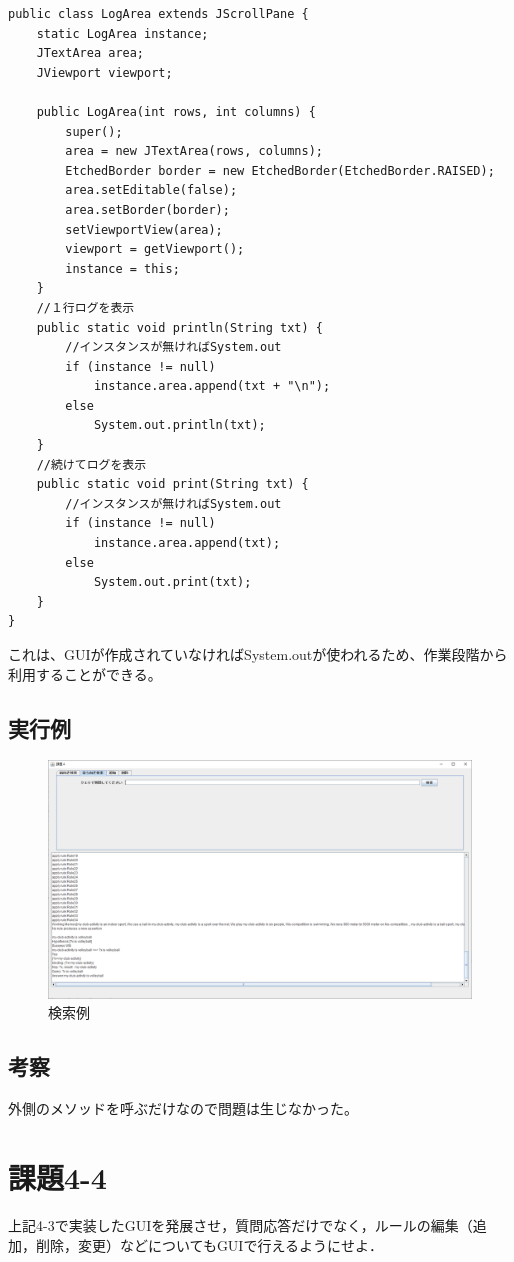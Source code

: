 \documentclass{jarticle}
\begin{document}
\begin{lstlisting}[caption=Log,label=src:log]
public class LogArea extends JScrollPane {
	static LogArea instance;
	JTextArea area;
	JViewport viewport;

	public LogArea(int rows, int columns) {
		super();
		area = new JTextArea(rows, columns);
		EtchedBorder border = new EtchedBorder(EtchedBorder.RAISED);
		area.setEditable(false);
		area.setBorder(border);
		setViewportView(area);
		viewport = getViewport();
		instance = this;
	}
	//１行ログを表示
	public static void println(String txt) {
    	//インスタンスが無ければSystem.out
		if (instance != null)
			instance.area.append(txt + "\n");
		else
			System.out.println(txt);
	}
	//続けてログを表示
	public static void print(String txt) {
    	//インスタンスが無ければSystem.out
		if (instance != null)
			instance.area.append(txt);
		else
			System.out.print(txt);
	}
}
\end{lstlisting}
これは、GUIが作成されていなければSystem.outが使われるため、作業段階から利用することができる。

\subsection{実行例}
\begin{figure}[!hbt]
  \centering
  \includegraphics[bb=0 0 1586 893,width=1.2\linewidth]{GUI1.png}
  \caption{検索例}
  \label{fig:Search}
\end{figure}
\subsection{考察}
外側のメソッドを呼ぶだけなので問題は生じなかった。

\section{課題4-4}
\begin{screen}
 上記4-3で実装したGUIを発展させ，質問応答だけでなく，ルールの編集（追加，削除，変更）などについてもGUIで行えるようにせよ．
\end{screen}
\end{document}
